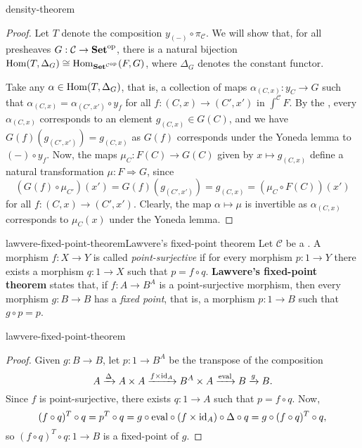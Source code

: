 \begin{example}{density-theorem}
    \begin{proof}
        Let $T$ denote the composition $y_{(-)} \circ \pi_\mathcal{C}$. We will show that, for all presheaves $G : \mathcal{C} \to \textbf{Set}^\textup{op}$, there is a natural bijection $\operatorname{Hom}(T, \Delta_G) \cong \operatorname{Hom}_{\textbf{Set}^{\mathcal{C}^\textup{op}}}(F, G)$, where $\Delta_G$ denotes the constant functor.
        
        Take any $\alpha \in \operatorname{Hom}(T, \Delta_G)$, that is, a collection of maps $\alpha_{(C, x)} : y_C \to G$ such that $\alpha_{(C, x)} = \alpha_{(C', x')} \circ y_f$ for all $f : (C, x) \to (C', x')$ in $\int^\mathcal{C} F$. By the , every $\alpha_{(C, x)}$ corresponds to an element $g_{(C, x)} \in G(C)$, and we have $G(f)(g_{(C', x')}) = g_{(C, x)}$ as $G(f)$ corresponds under the Yoneda lemma to $(-) \circ y_f$. Now, the maps $\mu_C : F(C) \to G(C)$ given by $x \mapsto g_{(C, x)}$ define a natural transformation $\mu : F \Rightarrow G$, since
        \[ (G(f) \circ \mu_{C'})(x') = G(f)(g_{(C', x')}) = g_{(C, x)} = (\mu_C \circ F(C))(x') \]
        for all $f : (C, x) \to (C', x')$. Clearly, the map $\alpha \mapsto \mu$ is invertible as $\alpha_{(C, x)}$ corresponds to $\mu_C(x)$ under the Yoneda lemma.
    \end{proof}
\end{example}

\begin{topic}{lawvere-fixed-point-theorem}{Lawvere's fixed-point theorem}
    Let $\mathcal{C}$ be a . A morphism $f : X \to Y$ is called \textit{point-surjective} if for every morphism $p : 1 \to Y$ there exists a morphism $q : 1 \to X$ such that $p = f \circ q$. \textbf{Lawvere's fixed-point theorem} states that, if $f : A \to B^A$ is a point-surjective morphism, then every morphism $g : B \to B$ has a \textit{fixed point}, that is, a morphism $p : 1 \to B$ such that $g \circ p = p$.
\end{topic}

\begin{example}{lawvere-fixed-point-theorem}
    \begin{proof}
        Given $g : B \to B$, let $p : 1 \to B^A$ be the transpose of the composition
        \[ A \xrightarrow{\Delta} A \times A \xrightarrow{f \times \textup{id}_A} B^A \times A \xrightarrow{\textup{eval}} B \xrightarrow{g} B . \]
        Since $f$ is point-surjective, there exists $q : 1 \to A$ such that $p = f \circ q$. Now,
        \[ (f \circ q)^T \circ q = p^T \circ q = g \circ \textup{eval} \circ (f \times \textup{id}_A) \circ \Delta \circ q = g \circ (f \circ q)^T \circ q , \]
        so $(f \circ q)^T \circ q : 1 \to B$ is a fixed-point of $g$.
    \end{proof}
\end{example}

